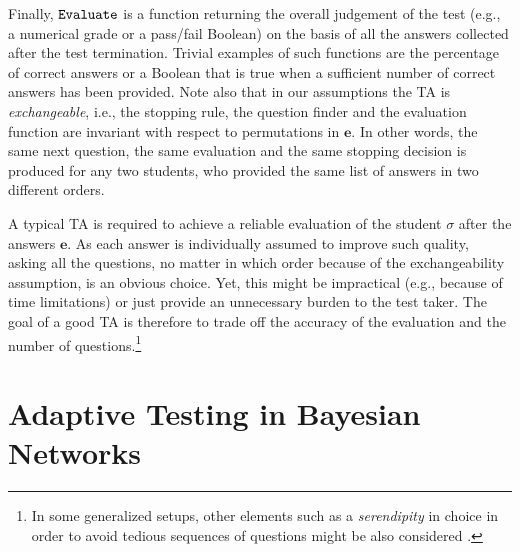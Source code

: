 \documentclass[runningheads]{llncs}
\begin{document}
Finally, ${\tt Evaluate}$ is a function returning the overall judgement of the test (e.g., a numerical grade or a pass/fail Boolean) on the basis of all the answers collected after the test termination. Trivial examples of such functions are the percentage of correct answers or a Boolean that is true when a sufficient number of correct answers has been provided. Note also that in our assumptions the TA is \emph{exchangeable}, i.e., the stopping rule, the question finder and the evaluation function are invariant with respect to permutations in $\bm{e}$. In other words, the same next question, the same evaluation and the same stopping decision is produced for any two students, who provided the same list of answers in two different orders.

A typical TA is required to achieve a reliable evaluation of the student $\sigma$ after the answers $\bm{e}$. As each answer is individually assumed to improve such quality, asking all the questions, no matter in which  order because of the exchangeability assumption, is an obvious choice. Yet, this might be impractical (e.g., because of time limitations) or just provide an unnecessary burden to the test taker. The goal of a good TA is therefore to trade off the accuracy of the evaluation and the number of questions.\footnote{In some generalized setups, other elements such as a \emph{serendipity} in choice in order to avoid tedious sequences of questions might be also considered \cite{xx}.}

\section{Adaptive Testing in Bayesian Networks}\label{sec:bncat}
\end{document}
